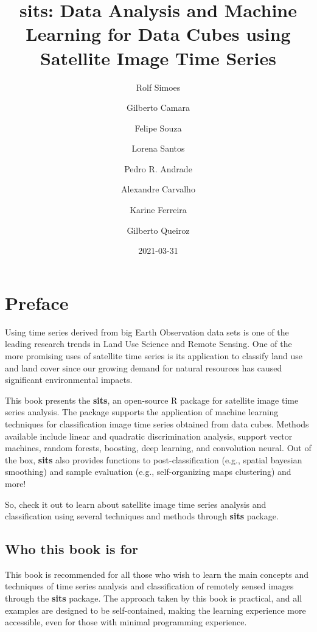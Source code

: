 \documentclass[a4paper,]{tufte-book}
\title{\textbf{sits}: Data Analysis and Machine Learning for Data Cubes using Satellite Image Time Series}
\author{Rolf Simoes \and Gilberto Camara \and Felipe Souza \and Lorena Santos \and Pedro R. Andrade \and Alexandre Carvalho \and Karine Ferreira \and Gilberto Queiroz}
\date{2021-03-31}
\begin{document}
\maketitle



{
\setcounter{tocdepth}{1}
\tableofcontents
}

\hypertarget{preface}{%
\chapter*{Preface}\label{preface}}

Using time series derived from big Earth Observation data sets is one of the leading research trends in Land Use Science and Remote Sensing. One of the more promising uses of satellite time series is its application to classify land use and land cover since our growing demand for natural resources has caused significant environmental impacts.

This book presents the \textbf{sits}, an open-source R package for satellite image time series analysis. The package supports the application of machine learning techniques for classification image time series obtained from data cubes. Methods available include linear and quadratic discrimination analysis, support vector machines, random forests, boosting, deep learning, and convolution neural. Out of the box, \textbf{sits} also provides functions to post-classification (e.g., spatial bayesian smoothing) and sample evaluation (e.g., self-organizing maps clustering) and more!

So, check it out to learn about satellite image time series analysis and classification using several techniques and methods through \textbf{sits} package.

\hypertarget{who-this-book-is-for}{%
\section*{Who this book is for}\label{who-this-book-is-for}}

This book is recommended for all those who wish to learn the main concepts and techniques of time series analysis and classification of remotely sensed images through the \textbf{sits} package. The approach taken by this book is practical, and all examples are designed to be self-contained, making the learning experience more accessible, even for those with minimal programming experience.
\end{document}
